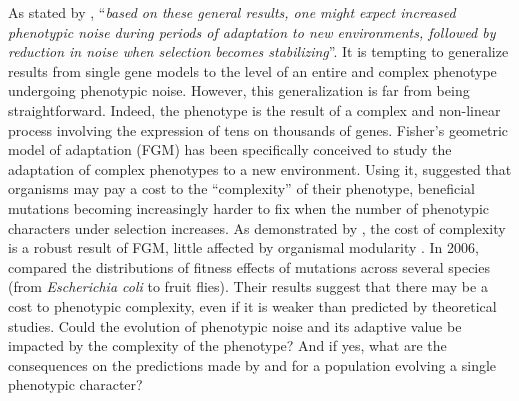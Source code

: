 As stated by \cite{eldar-and-elowitz-2010}, ``\textit{based on these general results, one might expect increased phenotypic noise during periods of adaptation to new environments, followed by reduction in noise when selection becomes stabilizing}''. It is tempting to generalize results from single gene models to the level of an entire and complex phenotype undergoing phenotypic noise. However, this generalization is far from being straightforward. Indeed, the phenotype is the result of a complex and non-linear process involving the expression of tens on thousands of genes.
Fisher's geometric model of adaptation (FGM) has been specifically conceived to study the adaptation of complex phenotypes to a new environment. Using it, \cite{fisher-1930} suggested that organisms may pay a cost to the ``complexity'' of their phenotype, beneficial mutations becoming increasingly harder to fix when the number of phenotypic characters under selection increases. As demonstrated by \cite{orr-2000}, the cost of complexity is a robust result of FGM, little affected by organismal modularity \citep{welch-and-waxman-2003}. In 2006, \cite{martin-and-lenormand-2006} compared the distributions of fitness effects of mutations across several species (from \textit{Escherichia coli} to fruit flies). Their results suggest that there may be a cost to phenotypic complexity, even if it is weaker than predicted by theoretical studies.
Could the evolution of phenotypic noise and its adaptive value be impacted by the complexity of the phenotype? And if yes, what are the consequences on the predictions made by \cite{zhang-et-al-2009} and \cite{eldar-and-elowitz-2010} for a population evolving a single phenotypic character?

